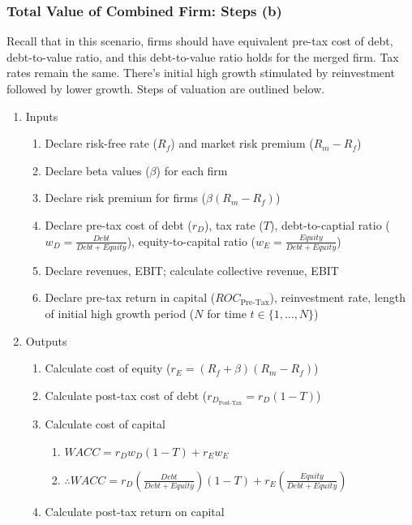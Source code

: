 \documentclass[11pt, english]{article}
\begin{document}
		\subsubsection*{Total Value of Combined Firm: Steps (b)}

	Recall that in this scenario, firms should have equivalent pre-tax cost of debt, debt-to-value ratio, and this debt-to-value ratio holds for the merged firm. Tax rates remain the same. There's initial high growth stimulated by reinvestment followed by lower growth. Steps of valuation are outlined below.
	
	\begin{enumerate}
	\setlength\itemsep{0cm}
		\item Inputs
		\begin{enumerate}
			\item Declare risk-free rate ($R_f$) and market risk premium ($R_m-R_f$)
			\item Declare beta values ($\beta$) for each firm
			\item Declare risk premium for firms ($\beta(R_m-R_f)$)
			\item Declare pre-tax cost of debt ($r_D$), tax rate ($T$), debt-to-captial ratio ($w_D=\frac{Debt}{Debt+Equity}$), equity-to-capital ratio ($w_E=\frac{Equity}{Debt+Equity}$)
			\item Declare revenues, EBIT; calculate collective revenue, EBIT
			\item Declare pre-tax return in capital ($ROC_{\textrm{Pre-Tax}}$), reinvestment rate, length of initial high growth period ($N$ for time $t\in\{1,...,N\}$)
		\end{enumerate}
		\item Outputs
		\begin{enumerate}
			\item Calculate cost of equity ($r_E=(R_f+\beta)(R_m-R_f)$)
			\item Calculate post-tax cost of debt ($r_{D_{\textrm{Post-Tax}}}=r_D(1-T)$)
			\item Calculate cost of capital
			\begin{enumerate}
				\item $WACC=r_Dw_D(1-T)+r_Ew_E$
				\item $\therefore WACC=r_D\left(\frac{Debt}{Debt+Equity}\right)(1-T)+r_E\left(\frac{Equity}{Debt+Equity}\right)$
			\end{enumerate}
			\item Calculate post-tax return on capital
			\begin{enumerate}

\end{enumerate}
\end{enumerate}
\end{enumerate}
\end{document}
